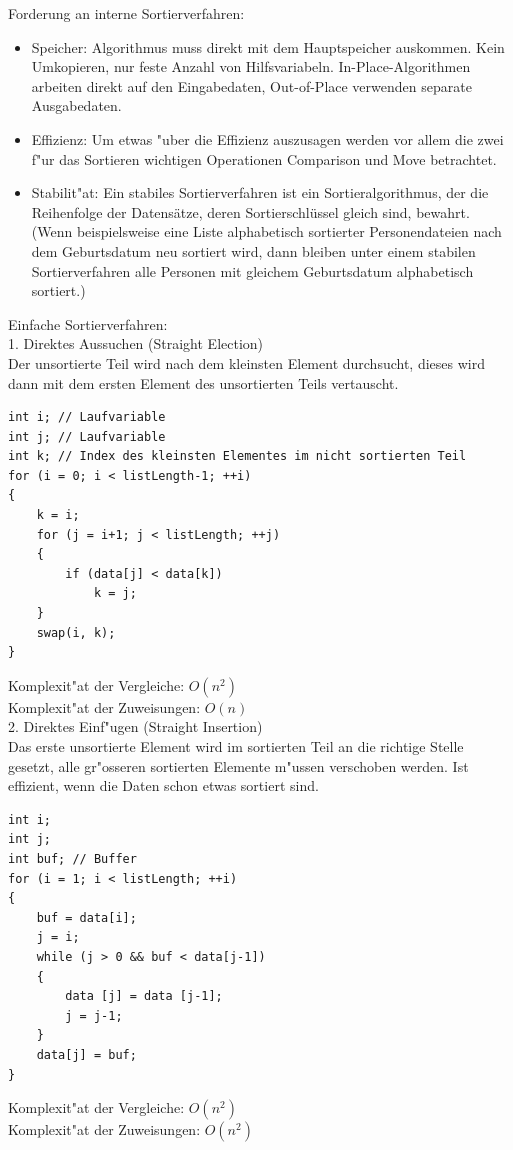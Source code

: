 Forderung an interne Sortierverfahren:\\
\begin{itemize}
\item Speicher: Algorithmus muss direkt mit dem Hauptspeicher auskommen. Kein Umkopieren, nur feste Anzahl von Hilfsvariabeln. In-Place-Algorithmen arbeiten direkt auf den Eingabedaten, Out-of-Place verwenden separate Ausgabedaten.
\item Effizienz: Um etwas "uber die Effizienz auszusagen werden vor allem die zwei f"ur das Sortieren wichtigen Operationen Comparison und Move betrachtet.
\item Stabilit"at: Ein stabiles Sortierverfahren ist ein Sortieralgorithmus, der die Reihenfolge der Datensätze, deren Sortierschlüssel gleich sind, bewahrt. (Wenn beispielsweise eine Liste alphabetisch sortierter Personendateien nach dem Geburtsdatum neu sortiert wird, dann bleiben unter einem stabilen Sortierverfahren alle Personen mit gleichem Geburtsdatum alphabetisch sortiert.)
\end{itemize}

Einfache Sortierverfahren:\\
1. Direktes Aussuchen (Straight Election)\\
Der unsortierte Teil wird nach dem kleinsten Element durchsucht, dieses wird dann mit dem ersten Element des unsortierten Teils vertauscht.\\
\begin{lstlisting}[style=C]
int i; // Laufvariable
int j; // Laufvariable
int k; // Index des kleinsten Elementes im nicht sortierten Teil
for (i = 0; i < listLength-1; ++i)
{
	k = i;
	for (j = i+1; j < listLength; ++j)
	{
		if (data[j] < data[k])
			k = j;
	}
	swap(i, k);
}
\end{lstlisting} 
Komplexit"at der Vergleiche: $O(n^2)$\\
Komplexit"at der Zuweisungen: $O(n)$\\

2. Direktes Einf"ugen (Straight Insertion)\\
Das erste unsortierte Element wird im sortierten Teil an die richtige Stelle gesetzt, alle gr"osseren sortierten Elemente m"ussen verschoben werden.
Ist effizient, wenn die Daten schon etwas sortiert sind. 
\begin{lstlisting}[style=C]
int i;
int j;
int buf; // Buffer
for (i = 1; i < listLength; ++i)
{
	buf = data[i];
	j = i;
	while (j > 0 && buf < data[j-1])
	{
		data [j] = data [j-1];
		j = j-1;
	}
	data[j] = buf;
}
\end{lstlisting} 
Komplexit"at der Vergleiche: $O(n^2)$\\
Komplexit"at der Zuweisungen: $O(n^2)$\\


